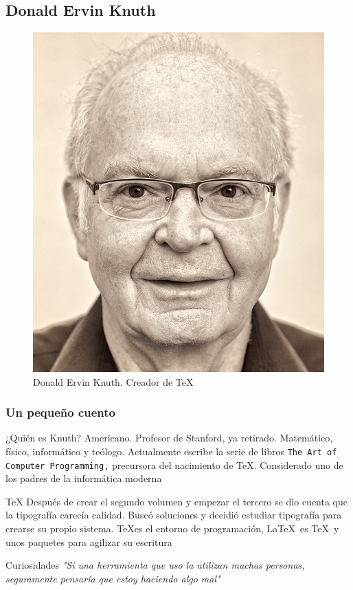 \documentclass{beamer}
\begin{document}

\subsection{Donald Ervin Knuth}
\begin{figure}
	\centering
	\vspace*{10px}
	\includegraphics[height=0.6\linewidth]{images/Donald-Knuth-Stanford-Computer-Science}
	\caption{Donald Ervin Knuth. Creador de \TeX}
	\label{fig:donald-knuth-stanford-computer-science}
\end{figure}

\begin{frame}
\frametitle{Un pequeño cuento}
\begin{block}{¿Quién es Knuth?}
	Americano. Profesor de Stanford, ya retirado. Matemático, físico, informático y teólogo. Actualmente escribe la serie de libros \texttt{The Art of Computer Programming,} precursora del nacimiento de \TeX. Considerado uno de los padres de la informática moderna
\end{block}

\begin{block}{\TeX}
	Después de crear el segundo volumen y empezar el tercero se dio cuenta que la tipografía carecía calidad. Buscó soluciones y decidió estudiar tipografía para crearse su propio sistema. \TeX es el entorno de programación, \LaTeX\ es \TeX\ y unos paquetes para agilizar su escritura
\end{block}

\begin{block}{Curiosidades}
	\textit{"Si una herramienta que uso la utilizan muchas personas, seguramente pensaría que estoy haciendo algo mal"}
\end{block}
\end{frame}
\end{document}
